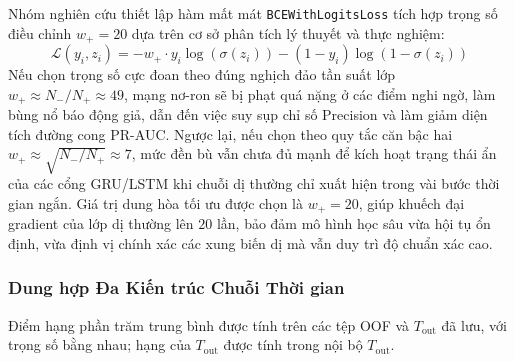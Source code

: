 Nhóm nghiên cứu thiết lập hàm mất mát \texttt{BCEWithLogitsLoss} tích hợp trọng số điều chỉnh $w_{+} = 20$ dựa trên cơ sở phân tích lý thuyết và thực nghiệm:
\begin{equation*}
    \mathcal{L}(y_i, z_i) = -w_{+} \cdot y_i \log(\sigma(z_i)) - (1 - y_i) \log(1 - \sigma(z_i))
\end{equation*}
Nếu chọn trọng số cực đoan theo đúng nghịch đảo tần suất lớp $w_{+} \approx N_{-} / N_{+} \approx 49$, mạng nơ-ron sẽ bị phạt quá nặng ở các điểm nghi ngờ, làm bùng nổ báo động giả, dẫn đến việc suy sụp chỉ số Precision và làm giảm diện tích đường cong PR-AUC. Ngược lại, nếu chọn theo quy tắc căn bậc hai $w_{+} \approx \sqrt{N_{-} / N_{+}} \approx 7$, mức đền bù vẫn chưa đủ mạnh để kích hoạt trạng thái ẩn của các cổng GRU/LSTM khi chuỗi dị thường chỉ xuất hiện trong vài bước thời gian ngắn. Giá trị dung hòa tối ưu được chọn là $w_{+} = 20$, giúp khuếch đại gradient của lớp dị thường lên $20$ lần, bảo đảm mô hình học sâu vừa hội tụ ổn định, vừa định vị chính xác các xung biến dị mà vẫn duy trì độ chuẩn xác cao.

\subsubsection{Dung hợp Đa Kiến trúc Chuỗi Thời gian}

Điểm hạng phần trăm trung bình được tính trên các tệp OOF và $T_{\text{out}}$ đã lưu, với trọng số bằng nhau; hạng của $T_{\text{out}}$ được tính trong nội bộ $T_{\text{out}}$.

